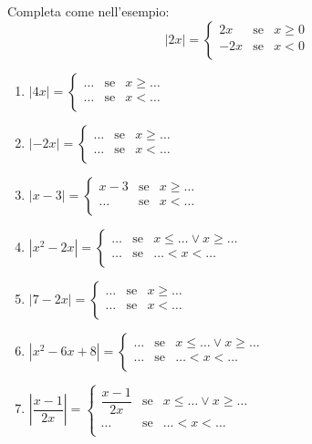 \begin{esercizio}\label{ese:03.1}
Completa come nell'esempio:
$$
|2x|=
        \left\lbrace 
        \begin{array}{lcl}
        2x & \text{se}& x\geq 0\\
        -2x & \text{se}& x< 0\\
        \end{array}
        \right.
$$

\begin{enumerate}
\item 
$
|4x|=
\left\lbrace 
\begin{array}{lcl}
\dots & \text{se}& x\geq\dots\\
\dots & \text{se}& x<\dots\\
\end{array}
\right.
$
\item 
$
|-2x|=
\left\lbrace 
\begin{array}{lcl}
\dots & \text{se}& x\geq\dots\\
\dots & \text{se}& x<\dots\\
\end{array}
\right.
$
\item 
$
|x-3|=
\left\lbrace 
\begin{array}{lcl}
x-3 & \text{se}& x\geq\dots\\
\dots & \text{se}& x<\dots\\
\end{array}
\right.
$
\item 
$
|x^2-2x|=
\left\lbrace 
\begin{array}{lcl}
\dots & \text{se}& x\leq\dots \vee x\geq\dots\\
\dots & \text{se}& \dots <x<\dots\\
\end{array}
\right.
$
\item 
$
|7-2x|=
\left\lbrace 
\begin{array}{lcl}
\dots & \text{se}& x\geq\dots\\
\dots & \text{se}& x<\dots\\
\end{array}
\right.
$
\item 
$
|x^2-6x+8|=
\left\lbrace 
\begin{array}{lcl}
\dots & \text{se}& x\leq\dots \vee x\geq\dots\\
\dots & \text{se}& \dots <x<\dots\\
\end{array}
\right.
$
\item 
$
|\dfrac{x-1}{2x}|=
\left\lbrace 
\begin{array}{lcl}
\dfrac{x-1}{2x} & \text{se}& x\leq\dots \vee x\geq\dots\\
\dots & \text{se}& \dots <x<\dots\\
\end{array}
\right.
$
\end{enumerate}
\end{esercizio}

